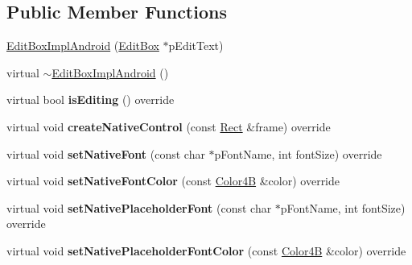 \subsection*{Public Member Functions}
\begin{DoxyCompactItemize}
\item 
\hyperlink{classui_1_1EditBoxImplAndroid_a793520aec53395d984275bf55896e1a0}{Edit\+Box\+Impl\+Android} (\hyperlink{classui_1_1EditBox}{Edit\+Box} $\ast$p\+Edit\+Text)
\item 
virtual \hyperlink{classui_1_1EditBoxImplAndroid_a48d3f3c87e8d49f14aa1ccee0ed6d649}{$\sim$\+Edit\+Box\+Impl\+Android} ()
\item 
\mbox{\label{classui_1_1EditBoxImplAndroid_a3fc1fa2ae962faaef75c186c2d800dc1}} 
virtual bool {\bfseries is\+Editing} () override
\item 
\mbox{\label{classui_1_1EditBoxImplAndroid_a8cf913763872050edf4dbd9819778946}} 
virtual void {\bfseries create\+Native\+Control} (const \hyperlink{classRect}{Rect} \&frame) override
\item 
\mbox{\label{classui_1_1EditBoxImplAndroid_a035122477bd4d64a6036db004bcb9f48}} 
virtual void {\bfseries set\+Native\+Font} (const char $\ast$p\+Font\+Name, int font\+Size) override
\item 
\mbox{\label{classui_1_1EditBoxImplAndroid_aaf90025c886ae3508931380eec76c4b9}} 
virtual void {\bfseries set\+Native\+Font\+Color} (const \hyperlink{structColor4B}{Color4B} \&color) override
\item 
\mbox{\label{classui_1_1EditBoxImplAndroid_a69b8521d292a033056a514be0583cd60}} 
virtual void {\bfseries set\+Native\+Placeholder\+Font} (const char $\ast$p\+Font\+Name, int font\+Size) override
\item 
\mbox{\label{classui_1_1EditBoxImplAndroid_aaa229c7ec58b7c9b825eb03932dba441}} 
virtual void {\bfseries set\+Native\+Placeholder\+Font\+Color} (const \hyperlink{structColor4B}{Color4B} \&color) override
\item 
\mbox{\label{classui_1_1EditBoxImplAndroid_a15078bb7d5e6e5e41a44894bbb9c3d4e}} 

\end{DoxyCompactItemize}
